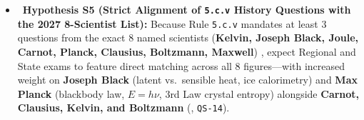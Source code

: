 \begin{itemize}
  \item \SPEC\ \textbf{Hypothesis S5 (Strict Alignment of \texttt{5.c.v} History Questions with the 2027 8-Scientist List):} Because Rule \texttt{5.c.v} mandates at least 3 questions from the exact 8 named scientists (\textbf{Kelvin, Joseph Black, Joule, Carnot, Planck, Clausius, Boltzmann, Maxwell}) , expect Regional and State exams to feature direct matching across all 8 figures---with increased weight on \textbf{Joseph Black} (latent vs.\ sensible heat, ice calorimetry) and \textbf{Max Planck} (blackbody law, $E=h\nu$, 3rd Law crystal entropy) alongside \textbf{Carnot, Clausius, Kelvin, and Boltzmann} (, \texttt{QS-14}).
\end{itemize}

